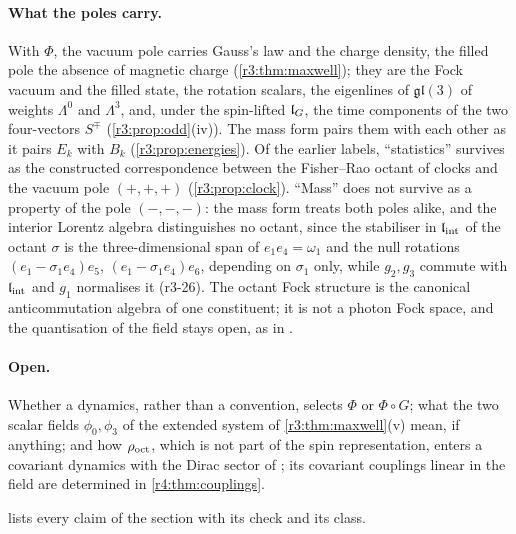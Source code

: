 \paragraph{What the poles carry.} With $\Phi$, the vacuum pole carries Gauss's law and the charge density, the filled pole the absence of
magnetic charge (\cref{r3:thm:maxwell}); they are the Fock vacuum and the filled state, the rotation scalars, the eigenlines of $\mathfrak{gl}(3)$ of
weights $\Lambda^0$ and $\Lambda^3$, and, under the spin-lifted $\mathfrak l_G$, the time components of the two four-vectors $S^\mp$ (\cref{r3:prop:odd}(iv)).
The mass form pairs them with each other as it pairs $E_k$ with $B_k$ (\cref{r3:prop:energies}). Of the earlier labels, ``statistics'' survives as
the constructed correspondence between the Fisher--Rao octant of clocks and the vacuum pole $(+,+,+)$ (\cref{r3:prop:clock}). ``Mass'' does not
survive as a property of the pole $(-,-,-)$: the mass form treats both poles alike, and the interior Lorentz algebra distinguishes no octant,
since the stabiliser in $\mathfrak l_{\rm int}$ of the octant $\sigma$ is the three-dimensional span of $e_1e_4=\omega_1$ and the null rotations
$(e_1-\sigma_1e_4)e_5$, $(e_1-\sigma_1e_4)e_6$, depending on $\sigma_1$ only, while $g_2,g_3$ commute with $\mathfrak l_{\rm int}$ and $g_1$ normalises it (r3-26). The
octant Fock structure is the canonical anticommutation algebra of one constituent; it is not a photon Fock space, and the quantisation of the
field stays open, as in \cite{FMB}.

\paragraph{Open.} Whether a dynamics, rather than a convention, selects $\Phi$ or $\Phi\circ G$; what the two scalar fields $\phi_0,\phi_3$ of the
extended system of \cref{r3:thm:maxwell}(v) mean, if anything; and how $\rho_{\rm oct}$, which is not part of the spin representation, enters a covariant
dynamics with the Dirac sector of \cite{ES17}; its covariant couplings linear in the field are determined in \cref{r4:thm:couplings}.

 lists every claim of the section with its check and its class.

